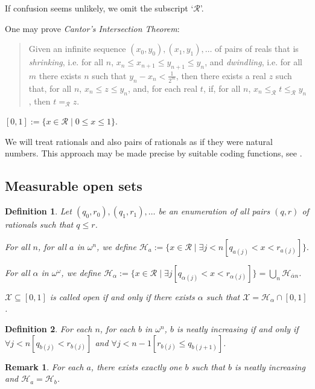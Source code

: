 \documentclass[a4paper]{amsart}
\theoremstyle{plain}
\newtheorem{remark}{Remark}
\newtheorem{definition}{Definition}
\begin{document}
 If confusion seems unlikely, we omit the subscript `$\mathcal{R}$'.
 
 One may prove \emph{Cantor's Intersection Theorem}: \begin{quote} Given an infinite sequence $(x_0, y_0), (x_1, y_1), \ldots$ of pairs of reals that is \emph{shrinking}, i.e. for all $n$, $x_n\le x_{n+1}\le y_{n+1}\le y_n$, and \emph{dwindling}, i.e. for all $m$ there exists $n$ such that $y_n-x_n < \frac{1}{2^m}$, then there exists a real $z$ such that, for all $n$, $x_n\le z \le y_n$, and, for each real $t$, if, for all $n$, $x_n\le_\mathcal{R} t \le_\mathcal{R} y_n$, then $t=_\mathcal{R} z$. 
 \end{quote}
 
 $[0,1]:= \{x\in \mathcal{R}\mid 0\le x \le 1\}$. 
 
 \smallskip We will treat rationals and also pairs of rationals as if they were natural numbers. This approach may be made precise by suitable coding functions, see \cite[Section 8]{veldman2011b}. 
 \subsection{Measurable open sets} \begin{definition}\label{D:opensetsmeasurable} Let $(q_0, r_0), (q_1, r_1), \ldots$ be an enumeration of all pairs $(q,r)$ of rationals such that $q\le  r$.

 For all $n$, for all $a$ in $\omega^n$, we define $\mathcal{H}_a :=\{x\in \mathcal{R}\mid \exists j < n[ q_{a(j)}< x<r_{a(j)}]\}.$
 
 For all $\alpha$ in $\omega^\omega$, we define $\mathcal{H}_\alpha :=\{x\in \mathcal{R}\mid \exists j[q_{\alpha(j)}<x<r_{\alpha(j)}]\}=\bigcup_n \mathcal{H}_{\overline\alpha n}$. 
 
 \smallskip $\mathcal{X}\subseteq [0,1]$ is called \emph{open} if and only if there exists $\alpha$ such that $\mathcal{X}=\mathcal{H}_\alpha\cap [0,1]$.
 
 \end{definition}
 \begin{definition} For each $n$, for each $b$ in $\omega^n$, 
 $b$ is \emph{neatly increasing} if and only if \\$\forall j<n[q_{b(j)}< r_{b(j)}]$ and $\forall j<n-1[r_{b(j)}\le q_{b(j+1)}]$. \end{definition}
 
 \begin{remark} For each $a$, there exists exactly one $b$ such that $b$ is neatly increasing and $\mathcal{H}_a=\mathcal{H}_b$.\end{remark}
 
\end{document}
